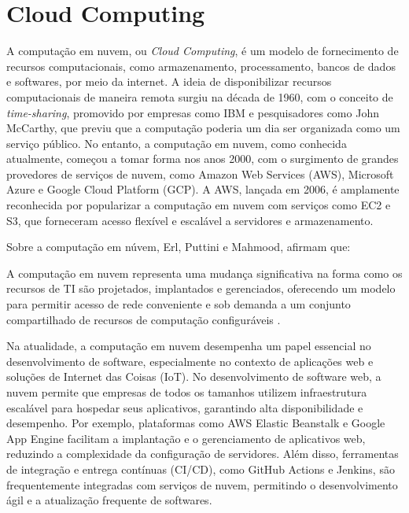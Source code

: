 \section{Cloud Computing}

A computação em nuvem, ou \textit{Cloud Computing}, é um modelo de fornecimento de recursos computacionais, como armazenamento, processamento, bancos de dados e softwares, por meio da internet. A ideia de disponibilizar recursos computacionais de maneira remota surgiu na década de 1960, com o conceito de \textit{time-sharing}, promovido por empresas como IBM e pesquisadores como John McCarthy, que previu que a computação poderia um dia ser organizada como um serviço público. No entanto, a computação em nuvem, como conhecida atualmente, começou a tomar forma nos anos 2000, com o surgimento de grandes provedores de serviços de nuvem, como Amazon Web Services (AWS), Microsoft Azure e Google Cloud Platform (GCP). A AWS, lançada em 2006, é amplamente reconhecida por popularizar a computação em nuvem com serviços como EC2 e S3, que forneceram acesso flexível e escalável a servidores e armazenamento.

Sobre a computação em núvem, Erl, Puttini e Mahmood, afirmam que:
\begin{citacao}
	A computação em nuvem representa uma mudança significativa na forma como os recursos de TI são projetados, implantados e gerenciados, oferecendo um modelo para permitir acesso de rede conveniente e sob demanda a um conjunto compartilhado de recursos de computação configuráveis \cite{Erl2013}.
\end{citacao}

Na atualidade, a computação em nuvem desempenha um papel essencial no desenvolvimento de software, especialmente no contexto de aplicações web e soluções de Internet das Coisas (IoT). No desenvolvimento de software web, a nuvem permite que empresas de todos os tamanhos utilizem infraestrutura escalável para hospedar seus aplicativos, garantindo alta disponibilidade e desempenho. Por exemplo, plataformas como AWS Elastic Beanstalk e Google App Engine facilitam a implantação e o gerenciamento de aplicativos web, reduzindo a complexidade da configuração de servidores. Além disso, ferramentas de integração e entrega contínuas (CI/CD), como GitHub Actions e Jenkins, são frequentemente integradas com serviços de nuvem, permitindo o desenvolvimento ágil e a atualização frequente de softwares.

